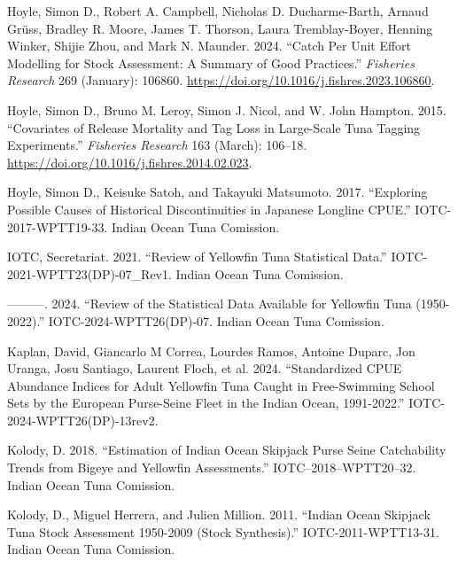 \documentclass[
]{scrartcl}
\newlength{\cslhangindent}
\newenvironment{CSLReferences}[2] %
 {\begin{list}{}{%
  \setlength{\itemindent}{0pt}
  \setlength{\leftmargin}{0pt}
  \setlength{\parsep}{0pt}
  \ifodd #1
   \setlength{\leftmargin}{\cslhangindent}
   \setlength{\itemindent}{-1\cslhangindent}
  \fi
  \setlength{\itemsep}{#2\baselineskip}}}
 {\end{list}}
\begin{document}
\begin{CSLReferences}{1}{0}
Hoyle, Simon D., Robert A. Campbell, Nicholas D. Ducharme-Barth, Arnaud
Grüss, Bradley R. Moore, James T. Thorson, Laura Tremblay-Boyer, Henning
Winker, Shijie Zhou, and Mark N. Maunder. 2024. {``Catch Per Unit Effort
Modelling for Stock Assessment: {A} Summary of Good Practices.''}
\emph{Fisheries Research} 269 (January): 106860.
\url{https://doi.org/10.1016/j.fishres.2023.106860}.

Hoyle, Simon D., Bruno M. Leroy, Simon J. Nicol, and W. John Hampton.
2015. {``Covariates of Release Mortality and Tag Loss in Large-Scale
Tuna Tagging Experiments.''} \emph{Fisheries Research} 163 (March):
106--18. \url{https://doi.org/10.1016/j.fishres.2014.02.023}.

Hoyle, Simon D., Keisuke Satoh, and Takayuki Matsumoto. 2017.
{``Exploring Possible Causes of Historical Discontinuities in {Japanese}
Longline {CPUE}.''} IOTC-2017-WPTT19-33. Indian Ocean Tuna Comission.

IOTC, Secretariat. 2021. {``Review of {Yellowfin Tuna Statistical
Data}.''} IOTC-2021-WPTT23(DP)-07\_Rev1. Indian Ocean Tuna Comission.

---------. 2024. {``Review of the Statistical Data Available for
Yellowfin Tuna (1950-2022).''} IOTC-2024-WPTT26(DP)-07. Indian Ocean
Tuna Comission.

Kaplan, David, Giancarlo M Correa, Lourdes Ramos, Antoine Duparc, Jon
Uranga, Josu Santiago, Laurent Floch, et al. 2024. {``Standardized
{CPUE} Abundance Indices for Adult Yellowfin Tuna Caught in
Free-Swimming School Sets by the {European} Purse-Seine Fleet in the
{Indian Ocean}, 1991-2022.''} IOTC-2024-WPTT26(DP)-13rev2.

Kolody, D. 2018. {``Estimation of {Indian Ocean Skipjack Purse Seine
Catchability Trends} from {Bigeye} and {Yellowfin Assessments}.''}
IOTC--2018--WPTT20--32. Indian Ocean Tuna Comission.

Kolody, D., Miguel Herrera, and Julien Million. 2011. {``Indian {Ocean
Skipjack Tuna Stock Assessment} 1950-2009 ({Stock Synthesis}).''}
IOTC-2011-WPTT13-31. Indian Ocean Tuna Comission.


\end{CSLReferences}
\end{document}
